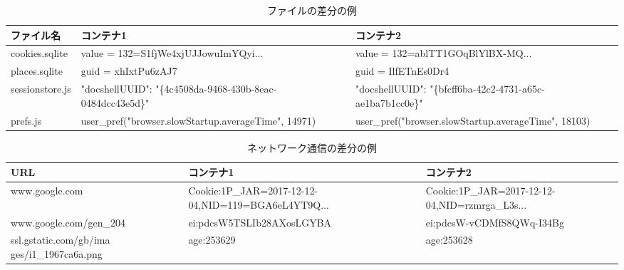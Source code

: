 \documentclass[a4paper,twocolumn,10pt]{jarticle}
\begin{document}
\begin{table}[ht]



\caption{ファイルの差分の例}
\centering

\begin{tabular}{ |l|p{6cm}|p{6cm}| }

 \hline
 \footnotesize{ファイル名}　&\footnotesize{コンテナ1}　&\footnotesize{コンテナ2}\\
 \hline
 \footnotesize{cookies.sqlite} & \footnotesize{value = 132=S1fjWe4xjUJJowuImYQyi...} & \footnotesize{value = 132=ablTT1GOqBlYlBX-MQ...}\\
\hline
 \footnotesize{places.sqlite} & \footnotesize{guid = xhIxtPu6zAJ7} & \footnotesize{guid = IlfETnEs0Dr4}\\
\hline
 \footnotesize{sessionstore.js} & \footnotesize{"docshellUUID": "\{4c4508da-9468-430b-8eac- 0484dcc43e5d\}"} & \footnotesize{"docshellUUID": "\{bfcff6ba-42c2-4731-a65c- ae1ba7b1cc0e\}"}\\
 \hline
\footnotesize{prefs.js} & \footnotesize{user\_pref("browser.slowStartup.averageTime", 14971)} & \footnotesize{user\_pref("browser.slowStartup.averageTime", 18103)}\\
\hline
\end{tabular}
\label{fig:data}
\end{table}

\begin{table}[ht]
\caption{ネットワーク通信の差分の例}
\centering

\begin{tabular}{ |p{3.5cm}|p{5cm}|p{5cm}| }

 \hline
 \footnotesize{URL}　&\footnotesize{コンテナ1}　&\footnotesize{コンテナ2}\\
 \hline
 \footnotesize{www.google.com} & \footnotesize{Cookie:1P\_JAR=2017-12-12-04,NID=119=BGA6eL4YT9Q...} & \footnotesize{Cookie:1P\_JAR=2017-12-12-04,NID=rzmrga\_L3s...}\\
\hline
 \footnotesize{www.google.com/gen\_204} & \footnotesize{ei:pdcsW5TSLIb28AXosLGYBA} & \footnotesize{ei:pdcsW-vCDMfS8QWq-I34Bg}\\
\hline
 \footnotesize{ssl.gstatic.com/gb/ima ges/i1\_1967ca6a.png} & \footnotesize{age:253629} & \footnotesize{age:253628}\\
 \hline

\end{tabular}
\label{fig:data}
\end{table}
\end{document}
